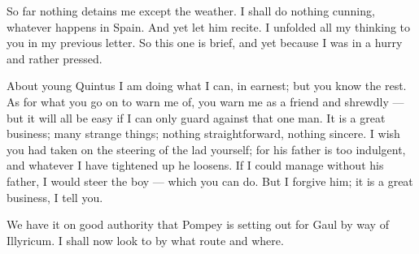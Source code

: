 

 So far nothing detains me except the weather. I shall do nothing cunning, whatever happens in Spain. \dag{}And yet let him recite\dag{}. I unfolded all my thinking to you in my previous letter. So this one is brief, \dag{}and yet\dag{} because I was in a hurry and rather pressed.

 About young Quintus I am doing what I can, in earnest; but you know the rest. As for what you go on to warn me of, you warn me as a friend and shrewdly --- but it will all be easy if I can only guard against that one man. It is a great business; many strange things; nothing straightforward, nothing sincere. I wish you had taken on the steering of the lad yourself; for his father is too indulgent, and whatever I have tightened up he loosens. If I could manage without his father, I would steer the boy --- which you can do. But I forgive him; it is a great business, I tell you.

 We have it on good authority that Pompey is setting out for Gaul by way of Illyricum. I shall now look to by what route and where.
